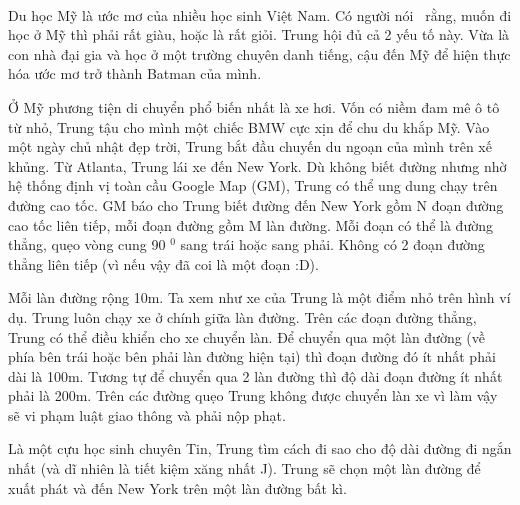  

Du học Mỹ là ước mơ của nhiều học sinh Việt Nam. Có người nói  rằng, muốn đi học ở Mỹ thì phải rất giàu, hoặc là rất giỏi. Trung hội đủ cả 2 yếu tố này. Vừa là con nhà đại gia và học ở một trường chuyên danh tiếng, cậu đến Mỹ để hiện thực hóa ước mơ trở thành Batman của mình. \textbf{}

Ở Mỹ phương tiện di chuyển phổ biến nhất là xe hơi. Vốn có niềm đam mê ô tô từ nhỏ, Trung tậu cho mình một chiếc BMW cực xịn để chu du khắp Mỹ. Vào một ngày chủ nhật đẹp trời, Trung bắt đầu chuyến du ngoạn của mình trên xế khủng. Từ Atlanta, Trung lái xe đến New York. Dù không biết đường nhưng nhờ hệ thống định vị toàn cầu Google Map (GM), Trung có thể ung dung chạy trên đường cao tốc. GM báo cho Trung biết đường đến New York gồm N đoạn đường cao tốc liên tiếp, mỗi đoạn đường gồm M làn đường. Mỗi đoạn có thể là đường thẳng, quẹo vòng cung 90 $^ 0 $ sang trái hoặc sang phải. Không có 2 đoạn đường thẳng liên tiếp (vì nếu vậy đã coi là một đoạn :D).

Mỗi làn đường rộng 10m. Ta xem như xe của Trung là một điểm nhỏ trên hình ví dụ. Trung luôn chạy xe ở chính giữa làn đường. Trên các đoạn đường thẳng, Trung có thể điều khiển cho xe chuyển làn. Để chuyển qua một làn đường (về phía bên trái hoặc bên phải làn đường hiện tại) thì đoạn đường đó ít nhất phải dài là 100m. Tương tự để chuyển qua 2 làn đường thì độ dài đoạn đường ít nhất phải là 200m. Trên các đường quẹo Trung không được chuyển làn xe vì làm vậy sẽ vi phạm luật giao thông và phải nộp phạt.

Là một cựu học sinh chuyên Tin, Trung tìm cách đi sao cho độ dài đường đi ngắn nhất (và dĩ nhiên là tiết kiệm xăng nhất J). Trung sẽ chọn một làn đường để xuất phát và đến New York trên một làn đường bất kì.

\